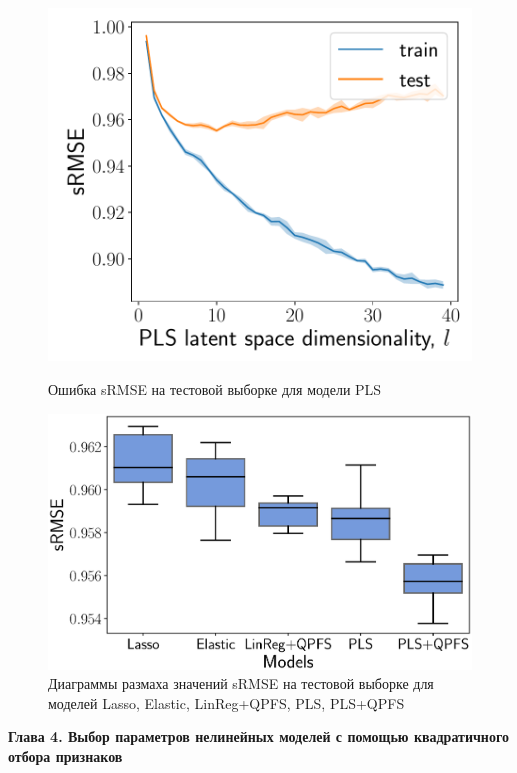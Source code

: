 \documentclass[11pt, a5paper]{dissert}
\begin{document}
\begin{figure}[ht]
	\begin{minipage}{.41\linewidth}
		\centering
		\includegraphics[width=1.\linewidth]{figs/ch3/pls_vs_k}
		\caption{ Ошибка sRMSE на тестовой выборке для модели PLS}
		\label{ch3:fig:pls_vs_k}
	\end{minipage}%
	\begin{minipage}{.55\linewidth}
		\centering
		\includegraphics[width=1.\linewidth]{figs/ch3/models2}
		\caption{Диаграммы размаха значений sRMSE на тестовой выборке для моделей Lasso, Elastic, LinReg+QPFS, PLS, PLS+QPFS}
		\label{ch3:fig:models}
	\end{minipage}
\end{figure}

\textbf{Глава 4. Выбор параметров нелинейных моделей с помощью квадратичного отбора признаков}
\label{ch:newton_qpfs}
\end{document}
